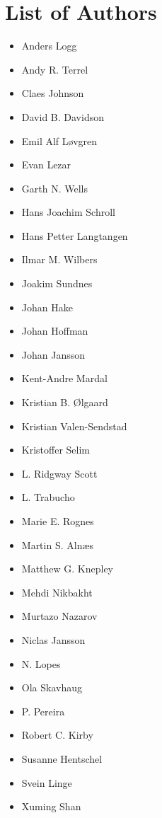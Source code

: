 \chapter*{List of Authors}



\begin{itemize}
\item
  Anders Logg
\item
  Andy R. Terrel
\item
  Claes Johnson
\item
  David B. Davidson
\item
  Emil Alf L{\o}vgren
\item
  Evan Lezar
\item
  Garth N. Wells
\item
  Hans Joachim Schroll
\item
  Hans Petter Langtangen
\item
  Ilmar M. Wilbers
\item
  Joakim Sundnes
\item
  Johan Hake
\item
  Johan Hoffman
\item
  Johan Jansson
\item
  Kent-Andre Mardal
\item
  Kristian B. \O{}lgaard
\item
  Kristian Valen-Sendstad
\item
  Kristoffer Selim
\item
  L. Ridgway Scott
\item
  L. Trabucho
\item
  Marie E. Rognes
\item
  Martin S. Aln{\ae}s
\item
  Matthew G. Knepley
\item
  Mehdi Nikbakht
\item
  Murtazo Nazarov
\item
  Niclas Jansson
\item
  N. Lopes
\item
  Ola Skavhaug
\item
  P. Pereira
\item
  Robert C. Kirby
\item
  Susanne Hentschel
\item
  Svein Linge
\item
  Xuming Shan
\end{itemize}
